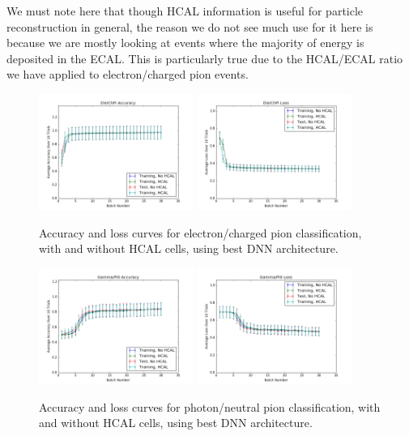 We must note here that though HCAL information is useful for particle reconstruction in general, the reason we do not see much use for it here is because we are mostly looking at events where the majority of energy is deposited in the ECAL. This is particularly true due to the HCAL/ECAL ratio we have applied to electron/charged pion events.

\begin{figure}[htbp]
\centering
\includegraphics[width=0.45\textwidth]{Images/Calo/HCAL_study_elechpi_accuracy.png}
\includegraphics[width=0.45\textwidth]{Images/Calo/HCAL_study_elechpi_loss.png}
\caption{Accuracy and loss curves for electron/charged pion classification, with and without HCAL cells, using best DNN architecture.}
\label{fig:HCAL_study_elechpi}
\end{figure}

\begin{figure}[htbp]
\centering
\includegraphics[width=0.45\textwidth]{Images/Calo/HCAL_study_gammapi0_accuracy.png}
\includegraphics[width=0.45\textwidth]{Images/Calo/HCAL_study_gammapi0_loss.png}
\caption{Accuracy and loss curves for photon/neutral pion classification, with and without HCAL cells, using best DNN architecture.}
\label{fig:HCAL_study_gammapi0}
\end{figure}

